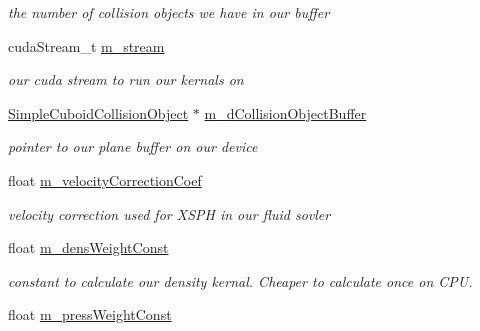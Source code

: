 \begin{DoxyCompactItemize}
\begin{DoxyCompactList}\small\item\em the number of collision objects we have in our buffer \end{DoxyCompactList}\item 
\hypertarget{class_s_p_h_engine_a51ddd3b4b93bd236fa8825c38b5a7885}{cuda\-Stream\-\_\-t \hyperlink{class_s_p_h_engine_a51ddd3b4b93bd236fa8825c38b5a7885}{m\-\_\-stream}}\label{class_s_p_h_engine_a51ddd3b4b93bd236fa8825c38b5a7885}

\begin{DoxyCompactList}\small\item\em our cuda stream to run our kernals on \end{DoxyCompactList}\item 
\hypertarget{class_s_p_h_engine_abbd48bc05ddd06c38ad6c3c4804d85c4}{\hyperlink{struct_simple_cuboid_collision_object}{Simple\-Cuboid\-Collision\-Object} $\ast$ \hyperlink{class_s_p_h_engine_abbd48bc05ddd06c38ad6c3c4804d85c4}{m\-\_\-d\-Collision\-Object\-Buffer}}\label{class_s_p_h_engine_abbd48bc05ddd06c38ad6c3c4804d85c4}

\begin{DoxyCompactList}\small\item\em pointer to our plane buffer on our device \end{DoxyCompactList}\item 
\hypertarget{class_s_p_h_engine_a8c3989dffaa0a6a8e00ecc399ae841a4}{float \hyperlink{class_s_p_h_engine_a8c3989dffaa0a6a8e00ecc399ae841a4}{m\-\_\-velocity\-Correction\-Coef}}\label{class_s_p_h_engine_a8c3989dffaa0a6a8e00ecc399ae841a4}

\begin{DoxyCompactList}\small\item\em velocity correction used for X\-S\-P\-H in our fluid sovler \end{DoxyCompactList}\item 
\hypertarget{class_s_p_h_engine_adcb21acd9bb63b005ea99f389deb57ed}{float \hyperlink{class_s_p_h_engine_adcb21acd9bb63b005ea99f389deb57ed}{m\-\_\-dens\-Weight\-Const}}\label{class_s_p_h_engine_adcb21acd9bb63b005ea99f389deb57ed}

\begin{DoxyCompactList}\small\item\em constant to calculate our density kernal. Cheaper to calculate once on C\-P\-U. \end{DoxyCompactList}\item 
\hypertarget{class_s_p_h_engine_a76e3d96571be7875343f02b29c4fa1c3}{float \hyperlink{class_s_p_h_engine_a76e3d96571be7875343f02b29c4fa1c3}{m\-\_\-press\-Weight\-Const}}\label{class_s_p_h_engine_a76e3d96571be7875343f02b29c4fa1c3}


\end{DoxyCompactItemize}
